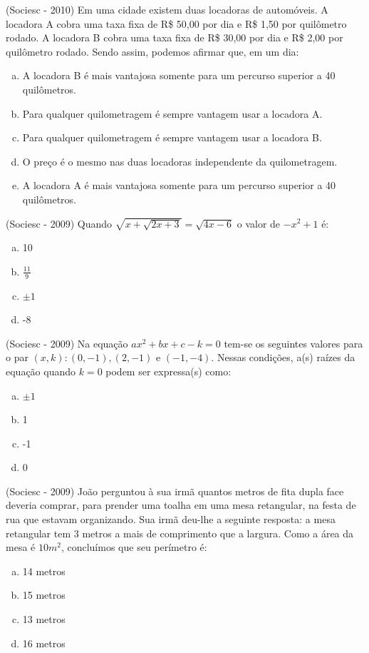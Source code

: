  \begin{exer}
 (Sociesc - 2010) Em uma cidade existem duas locadoras de automóveis. A locadora A cobra uma taxa fixa de R\$ 50,00 por dia e R\$ 1,50 por quilômetro rodado. A locadora B cobra uma taxa fixa de R\$ 30,00 por dia e R\$ 2,00 por quilômetro rodado. Sendo assim, podemos afirmar que, em um dia:
  \begin{enumerate}[a)]
  \item A locadora B é mais vantajosa somente para um percurso superior a 40 quilômetros.
  \item Para qualquer quilometragem é sempre vantagem usar a locadora A.
  \item Para qualquer quilometragem é sempre vantagem usar a locadora B.
  \item O preço é o mesmo nas duas locadoras independente da quilometragem.
  \item A locadora A é mais vantajosa somente para um percurso superior a 40 quilômetros.
 \end{enumerate}
 \end{exer}

 \begin{exer}
 (Sociesc - 2009) Quando $\sqrt{x + \sqrt{2x+3}}= \sqrt{4x-6}$ o valor de $-x^2+1$ é:
 \begin{enumerate}[a)]
  \item 10
  \item $\frac{11}{9}$
  \item $\pm 1$
  \item -8
 \end{enumerate}
 \end{exer}

 \begin{exer}
  (Sociesc - 2009) Na equação $ax^2+bx+c-k=0$ tem-se os seguintes valores para o par $(x, k): (0,-1), (2,-1) \text{ e } (-1,-4)$. Nessas condições, a(s) raízes da equação quando $k=0$ podem ser expressa(s) como:
 \begin{enumerate}[a)]
  \item $\pm 1$
  \item 1
  \item -1
  \item 0
 \end{enumerate}
 \end{exer}

 \begin{exer}
 (Sociesc - 2009) João perguntou à sua irmã quantos metros de fita dupla face deveria comprar, para prender uma toalha em uma mesa retangular, na festa de rua que estavam organizando. Sua irmã deu-lhe a seguinte resposta: a mesa retangular tem 3 metros a mais de comprimento que a largura. Como a área da mesa é $10 m^2$, concluímos que seu perímetro é:
  \begin{enumerate}[a)]
  \item 14 metros
  \item 15 metros
  \item 13 metros
  \item 16 metros
 \end{enumerate}
 \end{exer}

